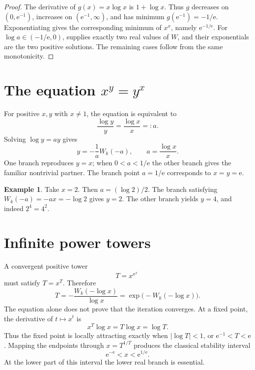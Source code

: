 \documentclass[11pt,oneside]{book}
\theoremstyle{definition}
\newtheorem{example}[theorem]{Example}
\theoremstyle{remark}
\newcommand{\ee}{\mathrm e}
\begin{document}
\begin{proof}
The derivative of $g(x)=x\log x$ is $1+\log x$.  Thus $g$ decreases on
$(0,\ee^{-1})$, increases on $(\ee^{-1},\infty)$, and has minimum
$g(\ee^{-1})=-1/\ee$.  Exponentiating gives the corresponding minimum of
$x^x$, namely $\ee^{-1/\ee}$.  For $\log a\in(-1/\ee,0)$,
 supplies exactly two real values of $W$, and their
exponentials are the two positive solutions.  The remaining cases follow
from the same monotonicity.
\end{proof}

\section{The equation $x^y=y^x$}

For positive $x,y$ with $x\ne1$, the equation is equivalent to
\[
 \frac{\log y}{y}=\frac{\log x}{x}=:a.
\]
Solving $\log y=ay$ gives
\begin{equation}\label{eq:xyyx}
 y=-\frac{1}{a}W_k(-a),\qquad a=\frac{\log x}{x}.
\end{equation}
One branch reproduces $y=x$; when $0<a<1/\ee$ the other branch gives the
familiar nontrivial partner.  The branch point $a=1/\ee$ corresponds to
$x=y=\ee$.

\begin{example}
Take $x=2$.  Then $a=(\log2)/2$.  The branch satisfying
$W_k(-a)=-a x=-\log2$ gives $y=2$.  The other branch yields $y=4$, and indeed
$2^4=4^2$.
\end{example}

\section{Infinite power towers}

A convergent positive tower
\[
 T=x^{x^{x^{\cdot^{\cdot^{\cdot}}}}}
\]
must satisfy $T=x^T$.  Therefore
\begin{equation}\label{eq:tower}
 T=-\frac{W_k(-\log x)}{\log x}
   =\exp\bigl(-W_k(-\log x)\bigr).
\end{equation}
The equation alone does not prove that the iteration converges.  At a fixed
point, the derivative of $t\mapsto x^t$ is
\[
 x^T\log x=T\log x=\log T.
\]
Thus the fixed point is locally attracting exactly when $|\log T|<1$, or
$\ee^{-1}<T<\ee$.  Mapping the endpoints through $x=T^{1/T}$ produces the
classical stability interval
\[
 \ee^{-\ee}<x<\ee^{1/\ee}.
\]
At the lower part of this interval the lower real branch is essential.
\end{document}
